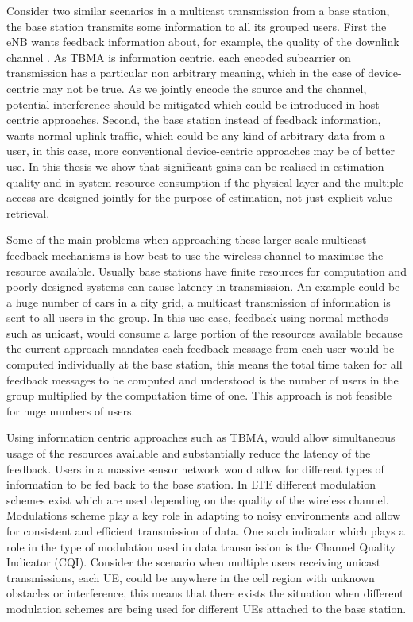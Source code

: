 \documentclass{article}
\begin{document}
Consider two similar scenarios in a multicast transmission from a base station, the base station transmits some information to all its grouped users. First the eNB wants feedback information about, for example, the quality of the downlink channel . As TBMA is information centric, each encoded subcarrier on transmission has a particular non arbitrary meaning, which in the case of device-centric may not be true. As we jointly encode the source and the channel, potential interference should be mitigated which could be introduced in host-centric approaches. Second, the base station instead of feedback information, wants normal uplink traffic, which could be any kind of arbitrary data from a user, in this case, more conventional device-centric approaches may be of better use. In this thesis we show that significant gains can be realised in estimation quality and in system resource consumption if the physical layer and the multiple access are designed jointly for the purpose of estimation, not just explicit value retrieval.

Some of the main problems when approaching these larger scale multicast feedback mechanisms is how best to use the wireless channel to maximise the resource available. Usually base stations have finite resources for computation and poorly designed systems can cause latency in transmission. An example could be a huge number of cars in a city grid, a multicast transmission of information is sent to all users in the group.  In this use case, feedback using normal methods such as unicast, would consume a large portion of the resources available because the current approach mandates each feedback message from each user would be computed individually at the base station, this means the total time taken for all feedback messages to be computed and understood is the number of users in the group multiplied by the computation time of one. This approach is not feasible for huge numbers of users.

Using information centric approaches such as TBMA, would allow simultaneous usage of the resources available and substantially reduce the latency of the feedback. Users in a massive sensor network would allow for different types of information to be fed back to the base station. In LTE different modulation schemes exist which are used depending on the quality of the wireless channel. Modulations scheme play a key role in adapting to noisy environments and allow for consistent and efficient transmission of data. One such indicator which plays a role in the type of modulation used in data transmission is the Channel Quality Indicator (CQI). Consider the scenario when multiple users receiving unicast transmissions, each UE, could be anywhere in the cell region with unknown obstacles or interference, this means that there exists the situation when different modulation schemes are being used for different UEs attached to the base station. 
\end{document}
